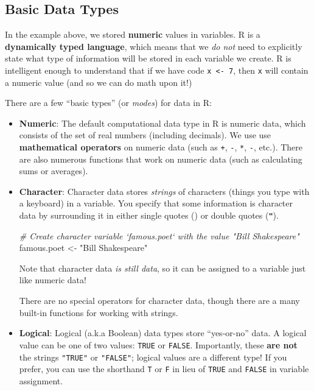 \documentclass[]{book}
\newenvironment{Shaded}{\begin{snugshade}}{\end{snugshade}}
\newcommand{\StringTok}[1]{\textcolor[rgb]{0.31,0.60,0.02}{#1}}
\newcommand{\CommentTok}[1]{\textcolor[rgb]{0.56,0.35,0.01}{\textit{#1}}}
\newcommand{\NormalTok}[1]{#1}
\theoremstyle{definition}
\theoremstyle{definition}
\theoremstyle{remark}
\begin{document}
\subsection{Basic Data Types}\label{basic-data-types}

In the example above, we stored \textbf{numeric} values in variables. R
is a \textbf{dynamically typed language}, which means that we \emph{do
not} need to explicitly state what type of information will be stored in
each variable we create. R is intelligent enough to understand that if
we have code \texttt{x\ \textless{}-\ 7}, then \texttt{x} will contain a
numeric value (and so we can do math upon it!)

There are a few ``basic types'' (or \emph{modes}) for data in R:

\begin{itemize}
\item
  \textbf{Numeric}: The default computational data type in R is numeric
  data, which consists of the set of real numbers (including decimals).
  We use use \textbf{mathematical operators} on numeric data (such as
  \texttt{+}, \texttt{-}, \texttt{*}, \texttt{-}, etc.). There are also
  numerous functions that work on numeric data (such as calculating sums
  or averages).
\item
  \textbf{Character}: Character data stores \emph{strings} of characters
  (things you type with a keyboard) in a variable. You specify that some
  information is character data by surrounding it in either single
  quotes (\textbf{\texttt{\textquotesingle{}}}) or double quotes
  (\textbf{\texttt{"}}).

\begin{Shaded}
\begin{Highlighting}[]
\CommentTok{# Create character variable `famous.poet` with the value "Bill Shakespeare"}
\NormalTok{famous.poet <-}\StringTok{ "Bill Shakespeare"}
\end{Highlighting}
\end{Shaded}

  Note that character data \emph{is still data}, so it can be assigned
  to a variable just like numeric data!

  There are no special operators for character data, though there are a
  many built-in functions for working with strings.
\item
  \textbf{Logical}: Logical (a.k.a Boolean) data types store
  ``yes-or-no'' data. A logical value can be one of two values:
  \texttt{TRUE} or \texttt{FALSE}. Importantly, these \textbf{are not}
  the strings \texttt{"TRUE"} or \texttt{"FALSE"}; logical values are a
  different type! If you prefer, you can use the shorthand \texttt{T} or
  \texttt{F} in lieu of \texttt{TRUE} and \texttt{FALSE} in variable
  assignment.


\end{itemize}
\end{document}
